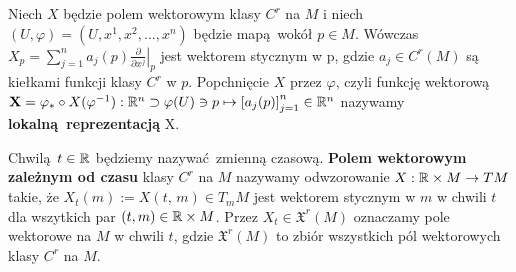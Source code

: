 Niech \(X\) będzie polem wektorowym klasy \(C^r\) na \(M\) i niech \((U, \varphi) = (U, x^1, x^2, \dots, x^n)\) będzie mapą wokół \(p\in M\). Wówczas \(X_p = \sum_{j=1}^{n}a_j(p)\left.\frac{\partial}{\partial x^j}\right|_p\) jest wektorem stycznym w p, gdzie \(a_j\in C^r(M)\) są kiełkami funkcji klasy \(C^r\) w \(p\). Popchnięcie \(X\) przez \(\varphi\), czyli funkcję wektorową \(\mathbf{X} = \varphi_{\ast}\circ X(\varphi^{-1}): \mathbb{R}^n \supset \varphi(U)\ni p \mapsto \left[a_j(p)\right]_{j=1}^n\in \mathbb{R}^n\) nazywamy \textbf{lokalną reprezentacją} X.

\begin{figure}[!h]
\centering
{}
\end{figure}

Chwilą \(t\in\mathbb{R}\) będziemy nazywać zmienną czasową. \textbf{Polem wektorowym zależnym od czasu} klasy \(C^r\) na \(M\) nazywamy odwzorowanie \(X:\mathbb{R}\times M\rightarrow TM\) takie, że \(X_t(m):=X(t,\,m) \in T_{m} M\) jest wektorem stycznym w \(m\) w chwili \(t\) dla wszytkich par \((t, m) \in \mathbb{R} \times M\). Przez \(X_t\in \mathfrak{X}^r(M)\) oznaczamy pole wektorowe na \(M\) w chwili \(t\), gdzie \(\mathfrak{X}^r(M)\) to zbiór wszystkich pól wektorowych klasy \(C^r\) na \(M\). 

